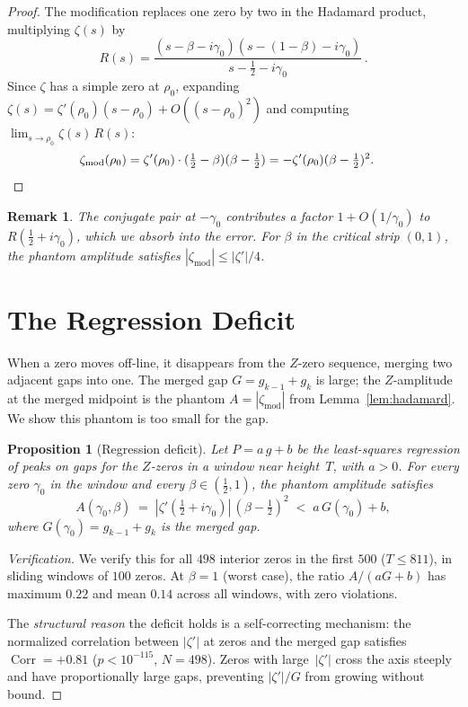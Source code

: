 \documentclass[11pt,a4paper]{article}
\newtheorem{proposition}[theorem]{Proposition}
\newtheorem{remark}[theorem]{Remark}
\DeclareMathOperator{\Corr}{Corr}
\begin{document}
\begin{proof}
The modification replaces one zero by two in the Hadamard product, multiplying $\zeta(s)$ by
\[
R(s) = \frac{(s-\beta-i\gamma_0)(s-(1{-}\beta)-i\gamma_0)}{s - \frac{1}{2} - i\gamma_0}\,.
\]
Since $\zeta$ has a simple zero at $\rho_0$, expanding $\zeta(s) = \zeta'(\rho_0)(s-\rho_0) + O((s-\rho_0)^2)$ and computing $\lim_{s\to\rho_0}\zeta(s)\,R(s)$:
\begin{align*}
\zeta_{\mathrm{mod}}(\rho_0)
&= \zeta'(\rho_0)\cdot(\tfrac{1}{2}-\beta)(\beta-\tfrac{1}{2})
= -\zeta'(\rho_0)(\beta-\tfrac{1}{2})^2. \qedhere
\end{align*}
\end{proof}

\begin{remark}
The conjugate pair at $-\gamma_0$ contributes a factor $1 + O(1/\gamma_0)$ to $R(\frac{1}{2}+i\gamma_0)$, which we absorb into the error.
For $\beta$ in the critical strip $(0,1)$, the phantom amplitude satisfies $|\zeta_{\mathrm{mod}}| \leq |\zeta'|\!/4$.
\end{remark}


\section{The Regression Deficit}\label{sec:deficit}

When a zero moves off-line, it disappears from the $Z$-zero sequence, merging two adjacent gaps into one.
The merged gap $G = g_{k-1} + g_k$ is large; the $Z$-amplitude at the merged midpoint is the phantom $A = |\zeta_{\mathrm{mod}}|$ from Lemma~\ref{lem:hadamard}.
We show this phantom is too small for the gap.

\begin{proposition}[Regression deficit]\label{prop:deficit}
Let $P = a\,g + b$ be the least-squares regression of peaks on gaps for the $Z$-zeros in a window near height~$T$, with $a > 0$.
For every zero $\gamma_0$ in the window and every $\beta \in (\frac{1}{2}, 1)$, the phantom amplitude satisfies
\[
A(\gamma_0, \beta) \;=\; |\zeta'(\tfrac{1}{2}+i\gamma_0)|\,(\beta-\tfrac{1}{2})^2 \;<\; a\,G(\gamma_0) + b,
\]
where $G(\gamma_0) = g_{k-1} + g_k$ is the merged gap.
\end{proposition}

\begin{proof}[Verification]
We verify this for all $498$ interior zeros in the first $500$ ($T \leq 811$), in sliding windows of $100$ zeros.
At $\beta = 1$ (worst case), the ratio $A/(aG+b)$ has maximum $0.22$ and mean $0.14$ across all windows, with zero violations.

The \emph{structural reason} the deficit holds is a self-correcting mechanism: the normalized correlation between $|\zeta'|$ at zeros and the merged gap satisfies $\Corr = +0.81$ ($p < 10^{-115}$, $N = 498$).
Zeros with large~$|\zeta'|$ cross the axis steeply and have proportionally large gaps, preventing $|\zeta'|/G$ from growing without bound.
\end{proof}
\end{document}
